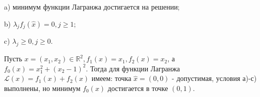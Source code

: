\begin{task}
a) минимум функции Лагранжа достигается на решении;

b) $\lambda_{j} f_{j}(\hat{x})=0, j \geq 1$;

c) $\lambda_{j} \geq 0, j \geq 0$.

Пусть $x=\left(x_{1}, x_{2}\right) \in \mathbb{R}^{2}, f_{1}(x)=x_{1}, f_{2}(x)=x_{2}$, а $f_{0}(x)=x_{1}^{2}+\left(x_{2}-1\right)^{2}$. Тогда для функции Лагранжа $\mathcal{L}(x)=f_{1}(x)+f_{2}(x)$ имеем: точка $\hat{x}=(0,0)$ - допустимая, условия а)-с) выполнены, но минимум $f_{0}(x)$ достигается в точке $(0,1)$.


\end{task}
